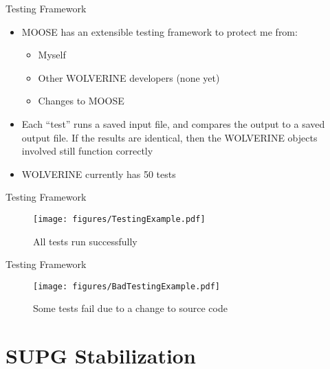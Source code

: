 \documentclass{beamer}
\begin{document}
\begin{frame}{Testing Framework}

\begin{itemize}
\item MOOSE has an extensible testing framework to protect me from:
	\begin{itemize}
		\item Myself
		\item Other WOLVERINE developers (none yet)
		\item Changes to MOOSE
	\end{itemize}
\item Each ``test'' runs a saved input file, and compares the output to a saved output file. If the results are identical, then the WOLVERINE objects involved still function correctly
\item WOLVERINE currently has 50 tests
\end{itemize}

\end{frame}


\begin{frame}{Testing Framework}

\begin{figure}[H]
  \centering
  \texttt{[image: figures/TestingExample.pdf]}
  \caption{All tests run successfully}
\end{figure}

\end{frame}


\begin{frame}{Testing Framework}

\begin{figure}[H]
  \centering
  \texttt{[image: figures/BadTestingExample.pdf]}
  \caption{Some tests fail due to a change to source code}
\end{figure}

\end{frame}


\section{SUPG Stabilization}
\end{document}
